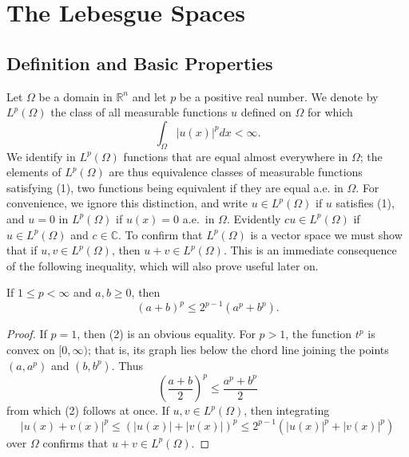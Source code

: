 \chapter[The Lebesgue Spaces $L^p(\Omega)$]%
  {The Lebesgue Spaces }


\section{Definition and Basic Properties}

\begin{para}
  Let $\Omega$ be a domain in $\mathbb{R}^n$ and let $p$ be a positive
  real number. We denote by $L^p(\Omega)$ the class of all measurable
  functions $u$ defined on $\Omega$ for which
  \begin{equation}\label{eq:2.1}
    \int_{\Omega} |u(x)|^p dx < \infty.
  \end{equation}
  We identify in $L^p(\Omega)$ functions that are equal almost everywhere in $\Omega$;
  the elements of $L^p(\Omega)$ are thus equivalence classes of measurable functions satisfying (1),
  two functions being equivalent if they are equal a.e. in $\Omega$. For convenience,
  we ignore this distinction, and write $u \in L^p(\Omega)$ if $u$ satisfies (1), and $u=0$ in $L^p(\Omega)$
  if $u(x)=0$ a.e.~in $\Omega$. Evidently $c u \in L^p(\Omega)$ if $u \in L^p(\Omega)$ and $c \in \mathbb{C}$. 
  To confirm that $L^p(\Omega)$ is a vector space we must show that if $u, v \in L^p(\Omega)$,
  then $u+v \in L^p(\Omega)$. This is an immediate consequence of the following inequality,
  which will also prove useful later on.
\end{para}


\begin{lemma}
  If $1 \leq p<\infty$ and $a, b \geq 0$, then
  \begin{equation}\label{eq:2.2}
    (a+b)^p \leq 2^{p-1}\left(a^p+b^p\right) .
  \end{equation}
\end{lemma}

\begin{proof}
  If $p=1$, then (2) is an obvious equality. For $p>1$, the function $t^p$ is convex on $[0, \infty)$;
  that is, its graph lies below the chord line joining the points
  $\left(a, a^p\right)$ and $\left(b, b^p\right)$. Thus
  \[
  \left(\frac{a+b}{2}\right)^p \leq \frac{a^p+b^p}{2}
  \]
  from which (2) follows at once.
  If $u, v \in L^p(\Omega)$, then integrating
  \[
  |u(x)+v(x)|^p \leq(|u(x)|+|v(x)|)^p \leq 2^{p-1}\left(|u(x)|^p+|v(x)|^p\right)
  \]
  over $\Omega$ confirms that $u+v \in L^p(\Omega)$.
\end{proof}

